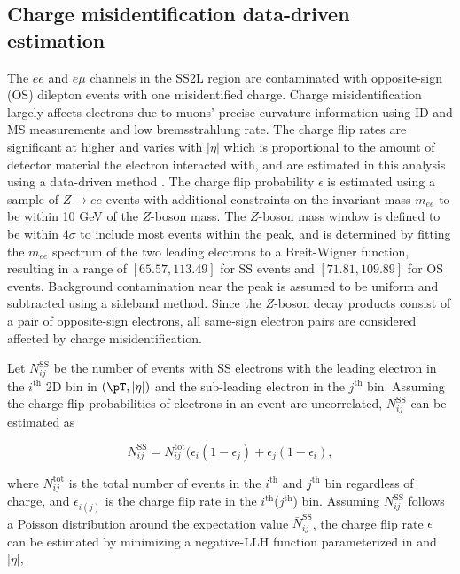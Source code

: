 \documentclass[../thesis.tex]{subfiles}
\begin{document}
\subsection{Charge misidentification data-driven estimation}
\label{sec:qmisid}
The $ee$ and $e\mu$ channels in the \acs{SS2L} region are contaminated with opposite-sign (\acs{OS}) dilepton events with one misidentified charge. Charge misidentification largely affects electrons due to muons' precise curvature information using \acs{ID} and \acs{MS} measurements and low bremsstrahlung rate. The charge flip rates are significant at higher \pT and varies with $|\eta|$ which is proportional to the amount of detector material the electron interacted with, and are estimated in this analysis using a data-driven method \citep{EXOT-2016-16}. The charge flip probability $\epsilon$ is estimated using a sample of $Z\rightarrow ee$ events with additional constraints on the invariant mass $m_{ee}$ to be within 10 GeV of the $Z$-boson mass. The $Z$-boson mass window is defined to be within $4\sigma$ to include most events within the peak, and is determined by fitting the $m_{ee}$ spectrum of the two leading electrons to a Breit-Wigner function, resulting in a range of $[65.57, 113.49]$ for SS events and $[71.81, 109.89]$ for \acs{OS} events. Background contamination near the peak is assumed to be uniform and subtracted using a sideband method. Since the $Z$-boson decay products consist of a pair of opposite-sign electrons, all same-sign electron pairs are considered affected by charge misidentification.

Let $N_{ij}^\mathrm{SS}$ be the number of events with \acs{SS} electrons with the leading electron in the $i^\mathrm{th}$ 2D bin in $(\pT,|\eta|)$ and the sub-leading electron in the $j^\mathrm{th}$ bin. Assuming the charge flip probabilities of electrons in an event are uncorrelated, $N_{ij}^\mathrm{SS}$ can be estimated as

\begin{equation}
N_{ij}^\mathrm{SS} = N_{ij}^\mathrm{tot} (\epsilon_i(1-\epsilon_j) + \epsilon_j(1-\epsilon_i),
\end{equation}

where $N_{ij}^\mathrm{tot}$ is the total number of events in the $i^\mathrm{th}$ and $j^\mathrm{th}$ bin regardless of charge, and $\epsilon_{i(j)}$ is the charge flip rate in the $i^\mathrm{th}$($j^\mathrm{th}$) bin. Assuming $N_{ij}^\mathrm{SS}$ follows a Poisson distribution around the expectation value $\bar{N}_{ij}^\mathrm{SS}$, the charge flip rate $\epsilon$ can be estimated by minimizing a negative-LLH function parameterized in \pT and $|\eta|$,
\end{document}
